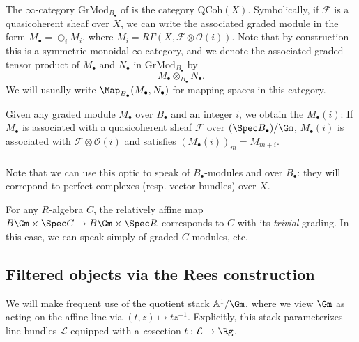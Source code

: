 \documentclass[10pt]{amsart}
\begin{document}
\subsubsection{}
The $\infty$-category $\mathrm{GrMod}_{B_\bullet}$ of  is the category $\mathrm{QCoh}(X)$. Symbolically, if $\mathcal{F}$ is a quasicoherent sheaf over $X$, we can write the associated graded module in the form $M_\bullet = \oplus_iM_i$, where $M_i = R\Gamma(X,\mathcal{F}\otimes\mathcal{O}(i))$. Note that by construction this is a symmetric monoidal $\infty$-category, and we denote the associated graded tensor product of $M_\bullet$ and $N_\bullet$ in $\mathrm{GrMod}_{B_\bullet}$ by
\[
M_\bullet\otimes_{B_\bullet}N_\bullet.
\]
We will usually write $\Map_{B_\bullet}(M_\bullet,N_\bullet)$ for mapping spaces in this category.


Given any graded module $M_\bullet$ over $B_\bullet$ and an integer $i$, we obtain the  $M_\bullet(i)$: If $M_\bullet$ is associated with a quasicoherent sheaf $\mathcal{F}$ over $(\Spec B_\bullet)/\Gm$, $M_\bullet(i)$ is associated with $\mathcal{F}\otimes \mathcal{O}(i)$ and satisfies $(M_\bullet(i))_m = M_{m+i}$.

\subsubsection{}
Note that we can use this optic to speak of  $B_\bullet$-modules and  over $B_\bullet$: they will correpond to perfect complexes (resp. vector bundles) over $X$.

For any $R$-algebra $C$, the relatively affine map $B\Gm\times \Spec C\to B\Gm\times \Spec R$ corresponds to $C$ with its \emph{trivial} grading. In this case, we can speak simply of graded $C$-modules, etc.



\subsection{Filtered objects via the Rees construction}
\label{subsec:rees_construction}

We will make frequent use of the quotient stack $\mathbb{A}^1/\Gm$, where we view $\Gm$ as acting on the affine line via $(t,z)\mapsto tz^{-1}$. Explicitly, this stack parameterizes line bundles $\mathcal{L}$ equipped with a \emph{co}section $t:\mathcal{L}\to \Rg$.
\end{document}
